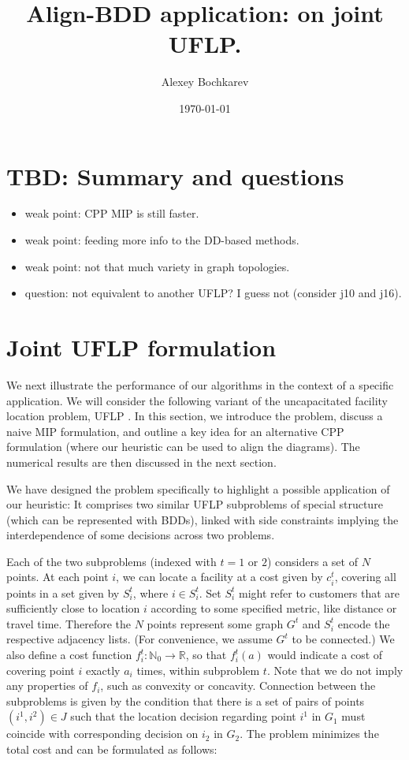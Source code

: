 \documentclass[11pt]{article}
\author{Alexey Bochkarev}
\date{\today}
\title{Align-BDD application: on joint UFLP.}
\begin{document}
\maketitle

\section{TBD: Summary and questions}
\label{sec:orgff23f23}
\begin{itemize}
\item weak point: CPP MIP is still faster.
\item weak point: feeding more info to the DD-based methods.
\item weak point: not that much variety in graph topologies.
\item question: not equivalent to another UFLP? I guess not (consider j10 and j16).
\end{itemize}

\section{Joint UFLP formulation}
\label{sec:jUFLP}
We next illustrate the performance of our algorithms in the context of a
specific application. We will consider the following variant of the
uncapacitated facility location problem, UFLP \citep{owen1998,revelle2008}. In
this section, we introduce the problem, discuss a naive MIP formulation, and
outline a key idea for an alternative CPP formulation (where our heuristic can
be used to align the diagrams). The numerical results are then discussed in the
next section.

We have designed the problem specifically to highlight a possible application of
our heuristic: It comprises two similar UFLP subproblems of special structure
(which can be represented with BDDs), linked with side constraints implying the
interdependence of some decisions across two problems.

Each of the two subproblems (indexed with \(t=1\) or \(2\)) considers a set of \(N\)
points. At each point \(i\), we can locate a facility at a cost given by \(c^t_i\),
covering all points in a set given by \(S^t_i\), where \(i \in S^t_i\). Set \(S^t_i\)
might refer to customers that are sufficiently close to location \(i\) according
to some specified metric, like distance or travel time. Therefore the \(N\) points
represent some graph \(G^t\) and \(S^t_i\) encode the respective adjacency lists.
(For convenience, we assume \(G^t\) to be connected.) We also define a cost
function \(f^t_i: \mathbb{N}_0\rightarrow\mathbb{R}\), so that \(f^t_i(a)\) would
indicate a cost of covering point \(i\) exactly \(a_i\) times, within subproblem
\(t\). Note that we do not imply any properties of \(f_i\), such as convexity or
concavity. Connection between the subproblems is given by the condition that
there is a set of pairs of points \((i^1, i^2) \in J\) such that the location
decision regarding point \(i^1\) in \(G_1\) must coincide with corresponding
decision on \(i_2\) in \(G_2\). The problem minimizes the total cost and can be
formulated as follows:
\end{document}
